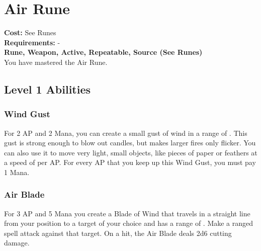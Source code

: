 \twocolumn
\section{Air Rune}\label{rune:air}
\textbf{Cost:} See Runes\\
\textbf{Requirements:} -\\
\textbf{Rune, Weapon, Active, Repeatable, Source (See Runes)}\\
You have mastered the Air Rune.

\subsection{Level 1 Abilities}

\subsubsection{Wind Gust}
For 2 AP and 2 Mana, you can create a small gust of wind in a range of .
This gust is strong enough to blow out candles, but makes larger fires only flicker.
You can also use it to move very light, small objects, like pieces of paper or feathers at a speed of  per AP.
For every AP that you keep up this Wind Gust, you must pay 1 Mana.

\subsubsection{Air Blade}
For 3 AP and 5 Mana you create a Blade of Wind that travels in a straight line from your position to a target of your choice and has a range of .
Make a ranged spell attack against that target.
On a hit, the Air Blade deals 2d6 cutting damage.